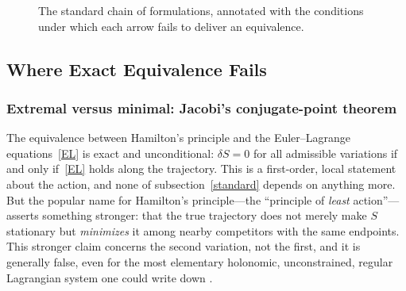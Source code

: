 \begin{figure}[htbp]
\centering
{}
\caption{The standard chain of formulations, annotated with the conditions under which each arrow fails to deliver an equivalence.}
\label{fig:map}
\end{figure}

\subsection{Where Exact Equivalence Fails}
\label{failures}

\subsubsection{Extremal versus minimal: Jacobi's conjugate-point theorem}
\label{jacobi}

The equivalence between Hamilton's principle and the Euler--Lagrange
equations~\eqref{EL} is exact and unconditional: $\delta S=0$ for all
admissible variations if and only if~\eqref{EL} holds along the trajectory.
This is a first-order, local statement about the action, and none of
subsection~\ref{standard} depends on anything more. But the popular name for
Hamilton's principle---the ``principle of \emph{least} action''---asserts
something stronger: that the true trajectory does not merely make $S$
stationary but \emph{minimizes} it among nearby competitors with the same
endpoints. This stronger claim concerns the second variation, not the first,
and it is generally false, even for the most elementary holonomic,
unconstrained, regular Lagrangian system one could write down
\cite{gray2009,graytaylor2007}.

